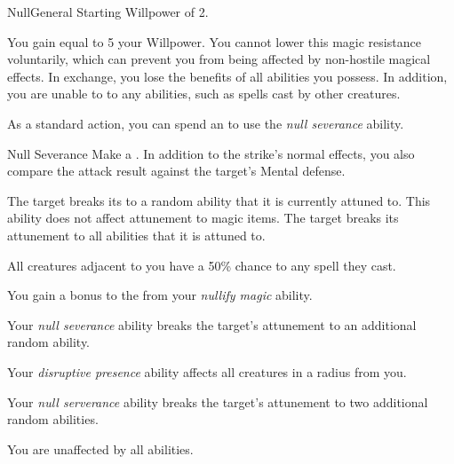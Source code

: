     \begin{feat}{Null}{General}
        \featpre Starting Willpower of 2.

         You gain  equal to 5 \add your Willpower.
        You cannot lower this magic resistance voluntarily, which can prevent you from being affected by non-hostile magical effects.
        In exchange, you lose the benefits of all  abilities you possess.
        In addition, you are unable to  to any  abilities, such as spells cast by other creatures.

         As a standard action, you can spend an  to use the \textit{null severance} ability.
        \begin{ability}{Null Severance}
            Make a .
            In addition to the strike's normal effects, you also compare the attack result against the target's Mental defense.

            \hit The target breaks its  to a random ability that it is currently attuned to.
            This ability does not affect attunement to magic items.
            \crit The target breaks its attunement to all abilities that it is attuned to.
        \end{ability}

         All creatures adjacent to you have a 50\% chance to  any spell they cast.

         You gain a  bonus to the  from your \textit{nullify magic} ability.

         Your \textit{null severance} ability breaks the target's attunement to an additional random ability.

         Your \textit{disruptive presence} ability affects all creatures in a \areamed radius  from you.

         Your \textit{null serverance} ability breaks the target's attunement to two additional random abilities.

         You are unaffected by all  abilities.
    \end{feat}

